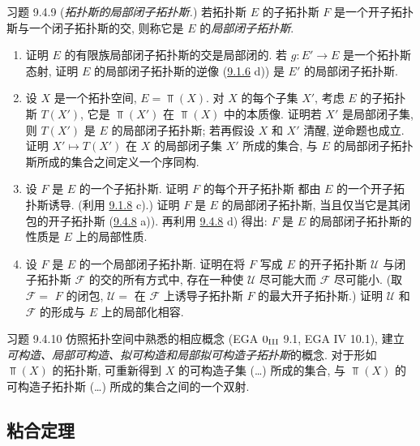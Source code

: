 \begin{enonce*}[remark]{习题 9.4.9}
(\emph{拓扑斯的局部闭子拓扑斯.})
若拓扑斯 $E$ 的子拓扑斯 $F$ 是一个开子拓扑斯与一个闭子拓扑斯的交,
则称它是 $E$ 的\emph{局部闭子拓扑斯}.
\begin{enumerate}
\renewcommand{\theenumi}{\alph{enumi}}
\renewcommand{\labelenumi}{\theenumi)}
\item 证明 $E$ 的有限族局部闭子拓扑斯的交是局部闭的.
若 $g:E'\rightarrow E$ 是一个拓扑斯态射,
证明 $E$ 的局部闭子拓扑斯的逆像
(\hyperref[IV.exer9.1.6]{9.1.6} d))
是 $E'$ 的局部闭子拓扑斯.

\item 设 $X$ 是一个拓扑空间, $E=\Top(X)$.
对 $X$ 的每个子集 $X'$, 考虑 $E$ 的子拓扑斯 $T(X')$,
它是 $\Top(X')$ 在 $\Top(X)$ 中的本质像.
证明若 $X'$ 是局部闭子集, 则 $T(X')$ 是 $E$ 的局部闭子拓扑斯;
若再假设 $X$ 和 $X'$ 清醒, 逆命题也成立.
证明 $X'\mapsto T(X')$ 在 $X$ 的局部闭子集 $X'$ 所成的集合,
与 $E$ 的局部闭子拓扑斯所成的集合之间定义一个序同构.

\item 设 $F$ 是 $E$ 的一个子拓扑斯.
证明 $F$ 的每个开子拓扑斯\pageoriginale
都由 $E$ 的一个开子拓扑斯诱导.
(利用 \hyperref[IV.exer9.1.8]{9.1.8} c).)
证明 $F$ 是 $E$ 的局部闭子拓扑斯,
当且仅当它是其闭包的开子拓扑斯 (\hyperref[IV.exer9.4.8]{9.4.8} a)).
再利用 \hyperref[IV.exer9.4.8]{9.4.8} d) 得出:
$F$ 是 $E$ 的局部闭子拓扑斯的性质是 $E$ 上的局部性质.

\item 设 $F$ 是 $E$ 的一个局部闭子拓扑斯.
证明在将 $F$ 写成 $E$ 的开子拓扑斯 $\mathcal{U}$
与闭子拓扑斯 $\mathcal{F}$ 的交的所有方式中,
存在一种使 $\mathcal{U}$ 尽可能大而 $\mathcal{F}$ 尽可能小.
(取 $\mathcal{F} =$ $F$ 的闭包,
$\mathcal{U} =$ 在 $\mathcal{F}$ 上诱导子拓扑斯 $F$ 的最大开子拓扑斯.)
证明 $\mathcal{U}$ 和 $\mathcal{F}$ 的形成与 $E$ 上的局部化相容.
\end{enumerate}
\end{enonce*}

\begin{enonce*}[remark]{习题 9.4.10}
仿照拓扑空间中熟悉的相应概念
(EGA ${\rm 0_{III}}$ 9.1, EGA IV 10.1),
建立\emph{可构造、局部可构造、拟可构造和局部拟可构造子拓扑斯}的概念.
对于形如 $\Top(X)$ 的拓扑斯,
可重新得到 $X$ 的可构造子集 (\resp\ldots) 所成的集合,
与 $\Top(X)$ 的可构造子拓扑斯 (\resp\ldots) 所成的集合之间的一个双射.
\end{enonce*}

\subsection{粘合定理}


